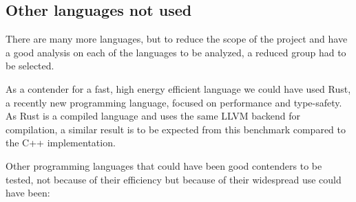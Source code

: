 \subsection{Other languages not used}

There are many more languages, but to reduce the scope of the project and have a good analysis on each of the languages to be analyzed, a reduced group had to be selected. 

As a contender for a fast, high energy efficient language we could have used Rust, a recently new programming language, focused on performance and type-safety. As Rust is a compiled language and uses the same \gls{LLVM} backend for compilation, a similar result is to be expected from this benchmark compared to the C++ implementation. 

Other programming languages that could have been good contenders to be tested, not because of their efficiency but because of their widespread use could have been:

